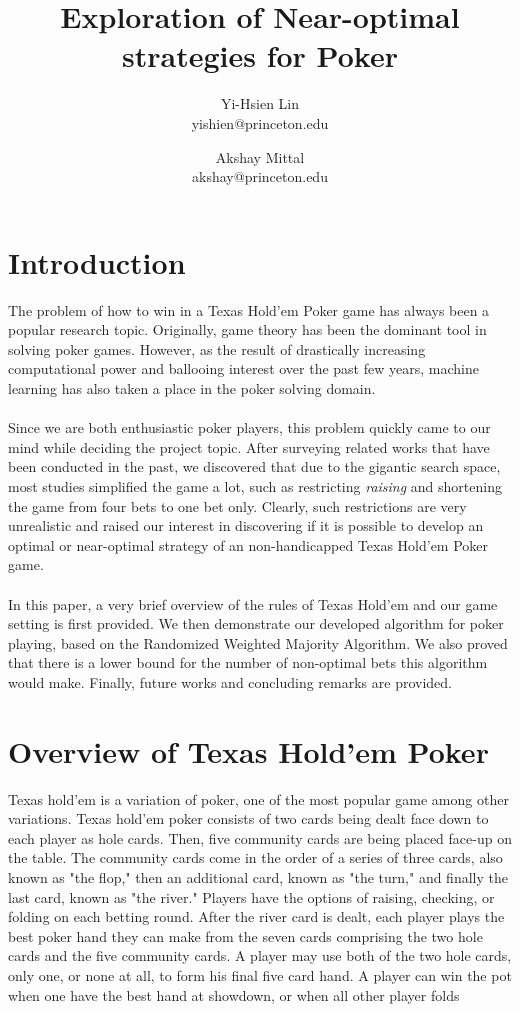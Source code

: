 \documentclass[12pt]{article}
\begin{document}
\title{Exploration of Near-optimal strategies for Poker}
\author{
	Yi-Hsien Lin \\ yishien@princeton.edu \and
	Akshay Mittal \\ akshay@princeton.edu
}
\date{}

\maketitle

\section{Introduction}
The problem of how to win in a Texas Hold'em Poker game has always been a popular research topic. Originally, game theory has been the dominant tool in solving poker games. However, as the result of drastically increasing computational power and ballooing interest over the past few years, machine learning  has also taken a place in the poker solving domain.\\
\\
Since we are both enthusiastic poker players, this problem quickly came to our mind while deciding the project topic. After surveying related works that have been conducted in the past, we discovered that due to the gigantic search space, most studies simplified the game a lot, such as restricting \emph{raising} and shortening the game from four bets to one bet only.
Clearly, such restrictions are very unrealistic and raised our interest in discovering if it is possible to develop an optimal or near-optimal strategy of an non-handicapped Texas Hold'em Poker game.\\
\\
In this paper, a very brief overview of the rules of Texas Hold'em and our game setting is first provided. We then demonstrate our developed algorithm for poker playing, based on the Randomized Weighted Majority Algorithm. We also proved that there is a lower bound for the number of non-optimal bets this algorithm would make. Finally, future works and concluding remarks are provided.


\section{Overview of Texas Hold'em Poker}
Texas hold'em is a variation of poker, one of the most popular game among other variations. Texas hold'em poker consists of two cards being dealt face down to each player as hole cards. Then, five community cards are being placed face-up on the table. The community cards come in the order of a series of three cards, also known as "the flop," then an additional card, known as "the turn," and finally the last card, known as "the river." Players have the options of raising, checking, or folding on each betting round. After the river card is dealt, each player plays the best poker hand they can make from the seven cards comprising the two hole cards and the five community cards. A player may use both of the two hole cards, only one, or none at all, to form his final five card hand. A player can win the pot when one have the best hand at showdown, or when all other player folds
\end{document}
